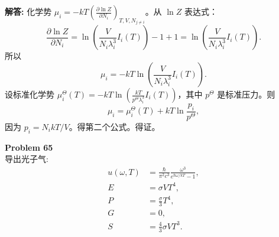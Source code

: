 \documentclass[12pt, a4paper, oneside]{ctexart}
\newenvironment{solution}{\par\noindent\textbf{解答:}\quad}{\par}
\begin{document}
\begin{solution}
    化学势 $\mu_i = -kT \left( \frac{\partial \ln Z}{\partial N_i} \right)_{T,V,N_{j\neq i}}$。从 $\ln Z$ 表达式：
    \[
    \frac{\partial \ln Z}{\partial N_i} = \ln \left( \frac{V}{N_i \lambda_i^3} I_i(T) \right) - 1 + 1 = \ln \left( \frac{V}{N_i \lambda_i^3} I_i(T) \right).
    \]
    所以
    \[
    \mu_i = -kT \ln \left( \frac{V}{N_i \lambda_i^3} I_i(T) \right).
    \]
    设标准化学势 $\mu_i^\Theta(T) = -kT \ln \left( \frac{kT}{p^\Theta \lambda_i^3} I_i(T) \right)$，其中 $p^\Theta$ 是标准压力。则
    \[
    \mu_i = \mu_i^\Theta(T) + kT \ln \frac{p_i}{p^\Theta},
    \]
    因为 $p_i = N_i kT / V$。得第二个公式。得证。
\end{solution}

\begin{mdframed}[backgroundcolor=gray!10, linewidth=0pt]
    \textbf{Problem 65} \\
    导出光子气:
    \[
    \begin{aligned}
        u(\omega, T) &= \frac{\hbar}{\pi^2 c^3} \frac{\omega^3}{e^{\hbar \omega / kT} - 1}, \\
        E &= \sigma V T^4, \\
        P &= \frac{\sigma}{3} T^4, \\
        G &= 0, \\
        S &= \frac{4}{3} \sigma V T^3.
    \end{aligned}
    \]
\end{mdframed}
\end{document}
